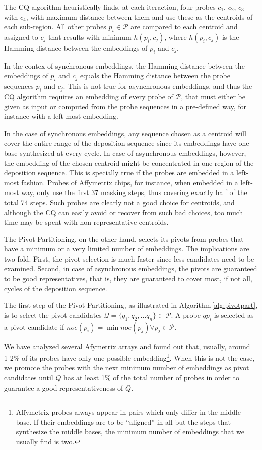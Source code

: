 \documentclass{llncs}
\begin{document}
The CQ algorithm heuristically finds, at each iteraction, four probes $c_1$, $c_2$,
$c_3$ with $c_4$, with maximum
distance between them and use these as the centroids of each sub-region. All
other probes $p_i \in \mathcal{P}$ are compared to each centroid and assigned to $c_j$
that results with minimum $h(p_i, c_j)$, where $h(p_i, c_j)$ is the Hamming distance
between the embeddings of $p_i$ and $c_j$.

In the contex of synchronous embeddings, the Hamming distance between the embeddings
of $p_i$ and $c_j$ equals the Hamming distance between the probe sequences $p_i$ and $c_j$.
This is not true for asynchronous embeddings, and thus the CQ algorithm requires an
embedding of every probe of $\mathcal{P}$, that must either be given as input or computed
from the probe sequences in a pre-defined way, for instance with a left-most embedding.

In the case of synchronous embeddings, any sequence chosen as a centroid will cover the
entire range of
the deposition sequence since its embeddings have one base synthesized at every cycle. In
case of asynchronous embeddings, however, the embedding of the chosen centroid might be
concentrated in one region of the deposition sequence. This is specially true if the probes
are embedded in a left-most fashion. Probes of Affymetrix chips, for instance, when embedded
in a left-most way, only use the first 37 masking steps, thus covering exactly half of the
total 74 steps. Such probes are clearly not a good choice for centroids, and although the CQ
can easily avoid or recover from such bad choices, too much time may be spent with
non-representative centroids.

The Pivot Partitioning, on the other hand, selects its pivots from probes that have a
minimum or a very limited number of embeddings. The implications are two-fold. First, the
pivot selection is much faster since less candidates need to be examined. Second, in case of
asynchronous embeddings, the pivots are guaranteed to be good representatives, that is, they
are guaranteed to cover most, if not all, cycles of the deposition sequence.

The first step of the Pivot Partitioning, as illustrated in Algorithm\,\ref{alg:pivotpart},
is to select the pivot candidates
$\mathcal{Q} = \{q_{1}, q_{2}, ... q_{n}\} \subset \mathcal{P}$.
A probe $qp_i$ is selected as a pivot candidate if
$noe(p_i) = \min noe(p_j) \forall p_j \in \mathcal{P}$.

We have analyzed several Afymetrix arrays and found out that, usually, around 1-2\% of its probes
have only one possible embedding\footnote{Affymetrix probes always appear in pairs which only
differ in the middle base. If their embeddings are to be ``aligned'' in all but the steps that
synthesize the middle bases, the minimum number of embeddings that we usually find is two.}.
When this is not the case, we promote the probes with the next minimum number of embeddings
as pivot candidates until $Q$ has at least 1\% of the total number of probes in order to
guarantee a good representativeness of $Q$.
\end{document}
